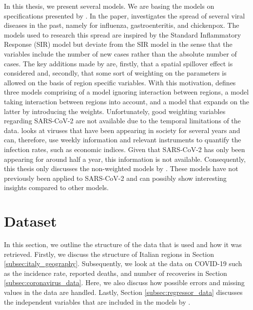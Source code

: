 \documentclass[12pt]{article}
\begin{document}
	In this thesis, we present several models. We are basing the models on specifications presented by \textcite{adda2016economic}. In the paper, \textcite{adda2016economic} investigates the spread of several viral diseases in the past, namely for influenza, gastroenteritis, and chickenpox. The models used to research this spread are inspired by the Standard Inflammatory Response (SIR) model but deviate from the SIR model in the sense that the variables include the number of new cases rather than the absolute number of cases. The key additions made by \textcite{adda2016economic} are, firstly, that a spatial spillover effect is considered and, secondly, that some sort of weighting on the parameters is allowed on the basis of region specific variables. With this motivation, \textcite{adda2016economic} defines three models comprising of a model ignoring interaction between regions, a model taking interaction between regions into account, and a model that expands on the latter by introducing the weights. Unfortunately, good weighting variables regarding SARS-CoV-2 are not available due to the temporal limitations of the data. \textcite{adda2016economic} looks at viruses that have been appearing in society for several years and can, therefore, use weekly information and relevant instruments to quantify the infection rates, such as economic indices. Given that SARS-CoV-2 has only been appearing for around half a year, this information is not available. Consequently, this thesis only discusses the non-weighted models by \textcite{adda2016economic}. These models have not previously been applied to SARS-CoV-2 and can possibly show interesting insights compared to other models.
	
	\section{Dataset} \label{sec:dataset}
	In this section, we outline the structure of the data that is used and how it was retrieved. Firstly, we discuss the structure of Italian regions in Section \ref{subsec:italy_geography}. Subsequently, we look at the data on COVID-19 such as the incidence rate, reported deaths, and number of recoveries in Section \ref{subsec:coronavirus_data}. Here, we also discuss how possible errors and missing values in the data are handled. Lastly, Section \ref{subsec:regressor_data} discusses the independent variables that are included in the models by \textcite{adda2016economic}.
	
\end{document}
